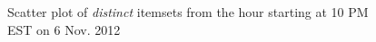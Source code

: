 \documentclass[letterpaper,12pt,titlepage,oneside,final]{book}
\begin{document}
\begin{landscape}
\begin{figure}
\caption{Scatter plot of \emph{distinct} itemsets from the hour starting at 10 PM EST on 6 Nov. 2012 }
\label{fig:winningHr}
\end{figure}
\end{landscape}
\end{document}
